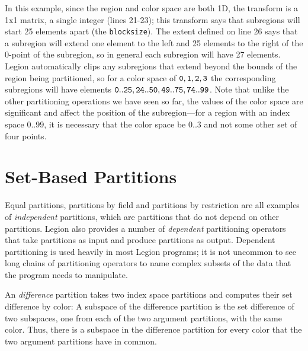   In this example, since the region and color space are both 1D, the transform is a 1x1 matrix, a single integer (lines 21-23); this transform
  says that subregions will start 25 elements apart (the {\tt blocksize}).  The extent defined on
  line 26 says that a subregion will extend one element to the left and 25 elements to the right of the 0-point of the subregion, so
  in general each subregion will have 27 elements.  Legion automatically clips any subregions that extend beyond the bounds of the region
  being partitioned, so for a color space of $\tt 0, 1, 2, 3$ the corresponding subregions will have elements $\tt 0..25, 24..50, 49..75, 74..99$.
  Note that unlike the other partitioning operations we have seen so far, the values of the color space are significant and affect the position
  of the subregion---for a region with an index space 0..99, it is necessary that the color space be $0..3$ and not some other set of four points.

\begin{figure}
  {\small
   
  }
  \caption{}
  \label{fig:pbr}
\end{figure}


\section{Set-Based Partitions}
\label{sec:set}

Equal partitions, partitions by field and partitions by restriction are all examples of {\em independent} partitions, which are partitions that do
not depend on other partitions.  Legion also provides a number of {\em dependent} partitioning operators that take partitions as input and
produce partitions as output.  Dependent partitioning is used heavily in most Legion programs; it is not uncommon to see long chains of
partitioning operators to name complex subsets of the data that the program needs to manipulate. 

An {\em difference} partition takes two index space partitions and computes their set difference by color: A subspace of the difference partition
is the set difference of two subspaces, one from each of the two argument partitions, with the same color.  Thus, there is a subspace in the difference
partition for every color that the two argument partitions have in common.

